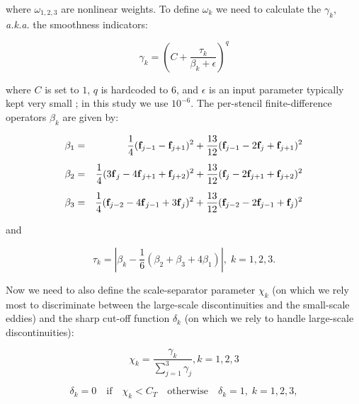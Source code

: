 where $\omega_{1,2,3}$ are nonlinear weights.
To define $\omega_k$ we need to calculate the $\gamma_k$, \emph{a.k.a.} the smoothness indicators:

\begin{equation}
  \gamma_k = \left(C + \dfrac{\tau_k}{\beta_k +\epsilon}\right)^q
  \label{eq:teno5_smooth}
\end{equation}

where $C$ is set to $1$, $q$ is hardcoded to $6$, and $\epsilon$ is an input parameter typically kept very small ; in this study we use $10^{-6}$.
The per-stencil finite-difference operators $\beta_k$ are given by:

\begin{equation}
    \begin{aligned}
        \beta_1 &=&  \dfrac{1}{4}({\bf f}_{j-1} - {\bf f}_{j+1})^2 + \dfrac{13}{12}({\bf f}_{j-1} - 2{\bf f}_{j}+{\bf f}_{j+1})^2 \\[0.5em]
        \beta_2 &=&  \dfrac{1}{4}({3\bf f}_{j} - {4\bf f}_{j+1} + {\bf f}_{j+2})^2 + \dfrac{13}{12}({\bf f}_{j} - 2{\bf f}_{j+1}+{\bf f}_{j+2})^2 \\[0.5em]
        \beta_3 &=&  \dfrac{1}{4}({\bf f}_{j-2} - {4\bf f}_{j-1} + {3\bf f}_{j})^2 + \dfrac{13}{12}({\bf f}_{j-2} - 2{\bf f}_{j-1}+{\bf f}_{j})^2 \\
    \end{aligned}
    \label{eq:teno5_betas}
\end{equation}

and

\begin{equation}
    \tau_k = \left\vert\beta_k - \dfrac{1}{6}(\beta_2 + \beta_3 + 4\beta_1)\right\vert,\; k=1,2,3.
    \label{eq:teno5_tau}
\end{equation}

Now we need to also define the scale-separator parameter $\chi_k$ (on which we rely most to discriminate between the large-scale discontinuities and the small-scale eddies) and the sharp cut-off function $\delta_k$ (on which we rely to handle large-scale discontinuities):

\begin{equation}
  \chi_k = \dfrac {\gamma_k} {\sum_{j=1}^3 \gamma_j }, k = 1,2,3
  \label{eq:teno5_chi}
\end{equation}

\begin{equation}
  \delta_k =  0 \quad \text{if} \quad \chi_k < C_T \quad \text{otherwise} \quad \delta_k=1,\; k = 1,2,3,
  \label{eq:teno5_delta}
\end{equation}

